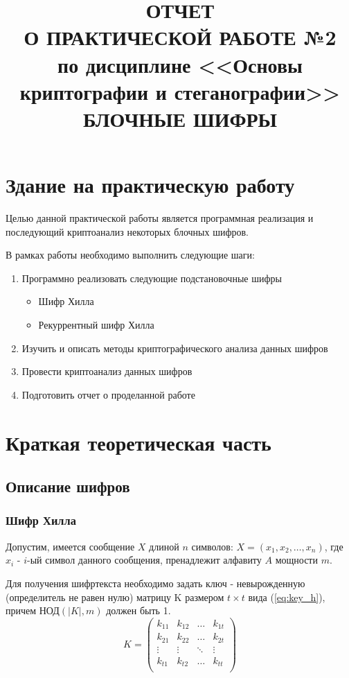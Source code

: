 \documentclass[a4paper]{article}
\title{
  ОТЧЕТ \\
  О ПРАКТИЧЕСКОЙ РАБОТЕ №2 \\
  по дисциплине <<Основы криптографии и стеганографии>> \\
  БЛОЧНЫЕ ШИФРЫ  
}
\begin{document}
  \templatedtitlepage
  
  \toc

  \section{Здание на практическую работу}

  Целью данной практической работы является программная реализация и последующий 
  криптоанализ некоторых блочных шифров.

  В рамках работы необходимо выполнить следующие шаги:

  \begin{enumerate}
    \setlength{\itemindent}{1cm}
    \item {
        Программно реализовать следующие подстановочные шифры 

        \begin{itemize}
            \setlength{\itemindent}{1cm}
            \item Шифр Хилла
            \item Рекуррентный шифр Хилла
        \end{itemize}
    }
    \item {
        Изучить и описать методы криптографического анализа данных шифров 
    }
    \item {
        Провести криптоанализ данных шифров
    }
    \item {
        Подготовить отчет о проделанной работе
    }
  \end{enumerate}

  \newpage
  \section{Краткая теоретическая часть}

  \subsection{Описание шифров}

  \subsubsection{Шифр Хилла}

  Допустим, имеется сообщение $X$ длиной $n$ символов: $X = (x_1, x_2, \dots, x_n)$,
  где $x_i$ - $i$-ый символ данного сообщения, пренадлежит алфавиту $A$ мощности $m$.

  Для получения шифртекста необходимо задать ключ - невырожденную (определитель не равен нулю)
  матрицу K размером $t \times t$ вида (\ref{eq:key_h}), причем НОД$(|K|, m)$ должен быть 1.
  \begin{equation}
    K = \begin{pmatrix}
        k_{11} & k_{12} & \dots & k_{1t} \\
        k_{21} & k_{22} & \dots & k_{2t} \\
        \vdots & \vdots & \ddots & \vdots \\
        k_{t1} & k_{t2} & \dots & k_{tt} \\
    \end{pmatrix}
    \label{eq:key_h}
  \end{equation}
\end{document}
